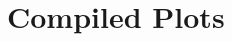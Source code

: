 \documentclass{article}
\begin{document}
\vspace{2cm}  %


% 
% 
% 

\section{Compiled Plots}

% 
\end{document}
